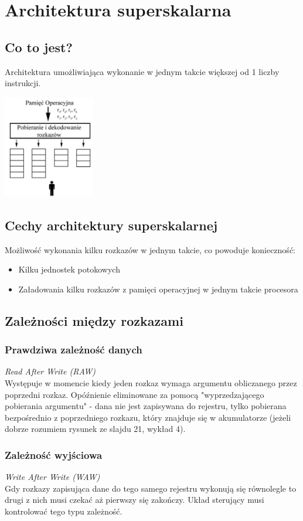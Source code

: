 \section{Architektura superskalarna}
	\subsection{Co to jest?}
		Architektura umożliwiająca wykonanie w jednym takcie większej od 1 liczby instrukcji.
		\begin{center}
			\includegraphics[width=0.3\textwidth]{./images/superskalarna01}
		\end{center}
   	\subsection{Cechy architektury superskalarnej}
        Możliwość wykonania kilku rozkazów w jednym takcie, co powoduje konieczność:
		\begin{itemize}
          	\item Kilku jednostek potokowych
         	\item Załadowania kilku rozkazów z pamięci operacyjnej w jednym takcie procesora
		\end{itemize}
    \subsection{Zależności między rozkazami}
    	\subsubsection{Prawdziwa zależność danych}
    		\emph{Read After Write (RAW)}\\
    		Występuje w momencie kiedy jeden rozkaz wymaga argumentu obliczanego przez poprzedni rozkaz. Opóźnienie eliminowane za pomocą "wyprzedzającego pobierania argumentu" - dana nie jest zapisywana do rejestru, tylko pobierana bezpośrednio z poprzedniego rozkazu, który znajduje się w akumulatorze (jeżeli dobrze rozumiem rysunek ze slajdu 21, wykład 4).
    	\subsubsection{Zależność wyjściowa}
    		\emph{Write After Write (WAW)}\\
    		Gdy rozkazy zapisująca dane do tego samego rejestru wykonują się równolegle to drugi z nich musi czekać aż pierwszy się zakończy. Układ sterujący musi kontrolować tego typu zależność.
